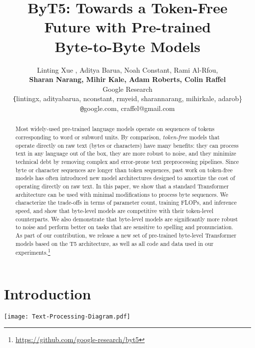 \documentclass[11pt,a4paper]{article}
\title{ByT5: Towards a Token-Free Future with Pre-trained \\ Byte-to-Byte Models}
\author{
 Linting Xue\Thanks{Equal contribution.} , Aditya Barua\footnotemark[1] , Noah Constant\footnotemark[1] , Rami Al-Rfou\footnotemark[1] , \\ {\bf Sharan Narang, Mihir Kale, Adam Roberts, Colin Raffel} \\
 Google Research \\
 {\texttt \{lintingx, adityabarua, nconstant, rmyeid, sharannarang, mihirkale, adarob\}} \\
 {\texttt @google.com, craffel@gmail.com}
}
\date{}
\newcommand{\bettertilde}{\raise.17ex\hbox{}}
\begin{document}
\maketitle
\begin{abstract}
Most widely-used pre-trained language models operate on sequences of tokens corresponding to word or subword units.
By comparison, \textit{token-free} models that operate directly on raw text (bytes or characters) have many benefits: they can process text in any language out of the box, they are more robust to noise, and they minimize technical debt by removing complex and error-prone text preprocessing pipelines.
Since byte or character sequences are longer than token sequences, past work on token-free models has often introduced new model architectures designed to amortize the cost of operating directly on raw text.
In this paper, we show that a standard Transformer architecture can be used with minimal modifications to process byte sequences.
We characterize the trade-offs in terms of parameter count, training FLOPs, and inference speed, and show that byte-level models are competitive with their token-level counterparts.
We also demonstrate that byte-level models are significantly more robust to noise and perform better on tasks that are sensitive to spelling and pronunciation.
As part of our contribution, we release a new set of pre-trained byte-level Transformer models based on the T5 architecture, as well as all code and data used in our experiments.\footnote{\label{fn:code}\url{https://github.com/google-research/byt5}}
\end{abstract}


\section{Introduction}

\begin{figure*}[h!]
\centering
\texttt{[image: Text-Processing-Diagram.pdf]}
     \caption{Pre-training example creation and network architecture of mT5 \cite{mt5} vs.~ByT5 (this work). \textbf{mT5}: Text is split into SentencePiece tokens, spans of \bettertilde{} tokens are masked (red), and the encoder/decoder transformer stacks have equal depth. \textbf{ByT5}: Text is processed as UTF-8 bytes, spans of \bettertilde{} bytes are masked, and the encoder is  deeper than the decoder. X, Y, and Z represent sentinel tokens.}
     \label{fig:text-processing}
\end{figure*}
\end{document}
